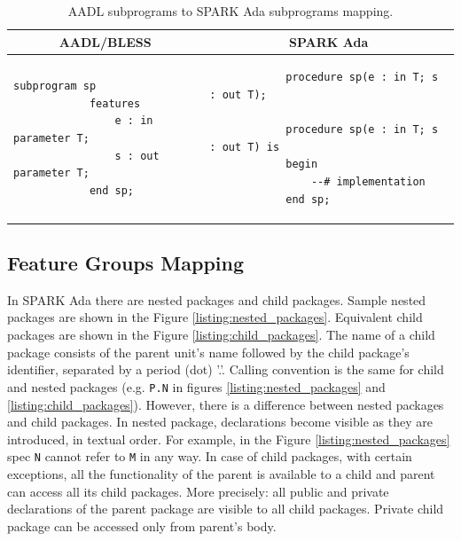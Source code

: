 \singlespacing
\begin{table}[!ht]
	\caption{AADL subprograms to SPARK Ada subprograms mapping.}
	\label{table:subprograms_mapping}
	\centering
  	\begin{tabular}{ | p{3in} | p{3in} |}

		\hline
		\multicolumn{1}{|c|}{\textbf{AADL/BLESS}} & \multicolumn{1}{|c|}{\textbf{SPARK Ada}} \\ \hline

		\begin{lstlisting}[language=aadl]
			subprogram sp
			features
				e : in parameter T;
				s : out parameter T;
			end sp;
		\end{lstlisting} 
		& 
		\begin{lstlisting}
			procedure sp(e : in T; s : out T);

			procedure sp(e : in T; s : out T) is 
			begin
				--# implementation
			end sp;
		\end{lstlisting} 		

		\\ \hline
	\end{tabular}
\end{table}
\doublespacing


\subsection{Feature Groups Mapping}
\label{codegen:mapping:feature_groups}

In SPARK Ada there are nested packages and child packages. Sample nested packages are shown in the Figure \ref{listing:nested_packages}. Equivalent child packages are shown in the Figure \ref{listing:child_packages}. The name of a child package consists of the parent unit's name followed by the child package's identifier, separated by a period (dot) '.'. Calling convention is the same for child and nested packages (e.g. \lstinline{P.N} in figures \ref{listing:nested_packages} and \ref{listing:child_packages}). However, there is a difference between nested packages and child packages. In nested package, declarations become visible as they are introduced, in textual order. For example, in the Figure \ref{listing:nested_packages} spec \lstinline{N} cannot refer to \lstinline{M} in any way. In case of child packages, with certain exceptions, all the functionality of the parent is available to a child and parent can access all its child packages. More precisely: all public and private declarations of the parent package are visible to all child packages. Private child package can be accessed only from parent's body.


